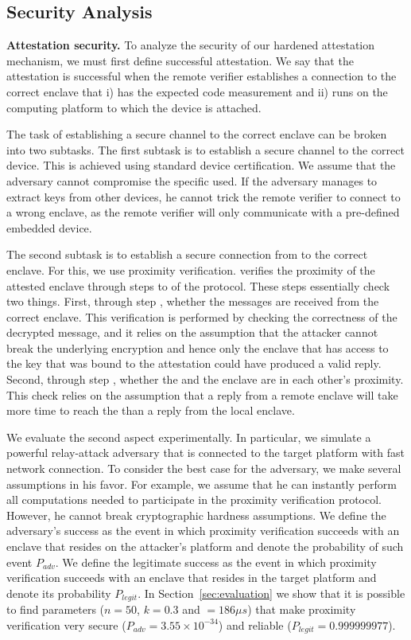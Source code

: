 \subsection{Security Analysis}

\noindent\textbf{Attestation security.}
To analyze the security of our hardened attestation mechanism, we must first define successful attestation. We say that the attestation is successful when the remote verifier establishes a connection to the correct enclave that i) has the expected code measurement and ii) runs on the computing platform to which the \device device is attached.


The task of establishing a secure channel to the correct enclave can be broken into two subtasks. The first subtask is to establish a secure channel to the correct \device device. This is achieved using standard device certification. We assume that the adversary cannot compromise the specific \device used. If the adversary manages to extract keys from other \device devices, he cannot trick the remote verifier to connect to a wrong enclave, as the remote verifier will only communicate with a pre-defined embedded device.




The second subtask is to establish a secure connection from \device to the correct enclave. For this, we use proximity verification. \device verifies the proximity of the attested enclave through steps \five to \eight of the protocol. These steps essentially check two things. First, through step \seven, whether the messages are received from the correct enclave. This verification is performed by checking the correctness of the decrypted message, and it relies on the assumption that the attacker cannot break the underlying encryption and hence only the enclave that has access to the key that was bound to the attestation could have produced a valid reply. Second, through step \eight, whether the \device and the enclave are in each other's proximity. This check relies on the assumption that a reply from a remote enclave will take more time to reach the \device than a reply from the local enclave.

We evaluate the second aspect experimentally. In particular, we simulate a powerful relay-attack adversary that is connected to the target platform with fast network connection. To consider the best case for the adversary, we make several assumptions in his favor. For example, we assume that he can instantly perform all computations needed to participate in the proximity verification protocol. However, he cannot break cryptographic hardness assumptions. We define the adversary's success as the event in which proximity verification succeeds with an enclave that resides on the attacker's platform and denote the probability of such event $P_{adv}$. We define the legitimate success as the event in which proximity verification succeeds with an enclave that resides in the target platform and denote its probability $P_{legit}$. In Section~\ref{sec:evaluation} we show that it is possible to find parameters ($n=50$, $k=0.3$ and \connect$=186 \mu s$) that make proximity verification very secure ($P_{adv}=3.55\times 10^{-34}$) and reliable ($P_{legit}=0.999999977$).



